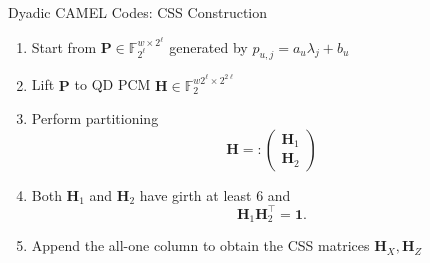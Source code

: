 \documentclass[10pt, aspectratio=169]{beamer}
\newcommand{\bH}{\mathbf{H}}
\newcommand{\bP}{\mathbf{P}}
\newcommand{\bone}{\mathbf{1}}
\newcommand{\Fq}{\mathbb{F}_{2^\ell}}
\begin{document}
\begin{frame}[c]{Dyadic CAMEL Codes: CSS Construction}


  \begin{enumerate}
    \item Start from $\bP\in\Fq^{w\times 2^\ell}$ generated by \(p_{u,j}=a_u\lambda_j+b_u\)
    \item Lift $\bP$ to QD PCM $\bH \in \mathbb{F}_2^{w 2^{\ell} \times 2^{2\ell}}$
    \item Perform partitioning
    \[\bH =: \begin{pmatrix} \bH_1 \\ \bH_2
    \end{pmatrix}\]

    \item Both $ \bH_1 $ and $ \bH_2 $ have girth at least 6 and
    \[ \bH_1\bH_2^\top=\bone .\]

    \item Append the all-one column to obtain the CSS matrices $\bH_X,\bH_Z$
  \end{enumerate}
\end{frame}
\end{document}
